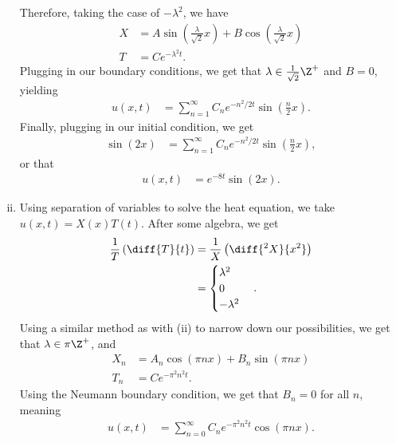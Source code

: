 \documentclass[10pt]{mypackage}
\begin{document}
\begin{solution}
\begin{enumerate}[(i)]
      Therefore, taking the case of $-\lambda^2$, we have
      \begin{align*}
        X &= A\sin\left( \frac{\lambda}{\sqrt{2}} x \right) + B\cos\left( \frac{\lambda}{\sqrt{2}} x \right)\\
        T &= Ce^{-\lambda^2 t}.
      \end{align*}
      Plugging in our boundary conditions, we get that $\lambda\in \frac{1}{\sqrt{2}}\Z^{+}$ and $B = 0$, yielding
      \begin{align*}
        u\left( x,t \right) &= \sum_{n=1}^{\infty}C_ne^{-n^2/2 t}\sin\left( \frac{n}{2}x \right).
      \end{align*}
      Finally, plugging in our initial condition, we get
      \begin{align*}
        \sin\left( 2x \right) &= \sum_{n=1}^{\infty}C_ne^{-n^2/2 t}\sin\left( \frac{n}{2}x \right),
      \end{align*}
      or that 
      \begin{align*}
        u\left( x,t \right) &= e^{-8t}\sin\left( 2x \right).
      \end{align*}
    \item Using separation of variables to solve the heat equation, we take $u\left( x,t \right) = X(x)T(t)$. After some algebra, we get
      \begin{align*}
        \frac{1}{T}\left( \diff{T}{t} \right) &= \frac{1}{X} \left( \diff{^2X}{x^2} \right)\\
                                              &= \begin{cases}
                                                \lambda^2 \\
                                                0\\
                                                -\lambda^2
                                              \end{cases}.
      \end{align*}
      Using a similar method as with (ii) to narrow down our possibilities, we get that $\lambda\in \pi\Z^+$, and
      \begin{align*}
        X_n &= A_n\cos\left( \pi n x \right) + B_n\sin\left( \pi n x \right)\\
        T_n &= Ce^{-\pi^2 n^2 t}.
      \end{align*}
      Using the Neumann boundary condition, we get that $B_n = 0$ for all $n$, meaning
      \begin{align*}
        u\left( x,t \right) &= \sum_{n=0}^{\infty}C_ne^{-\pi^2n^2 t}\cos\left( \pi n x \right).

\end{align*}
\end{enumerate}
\end{solution}
\end{document}
